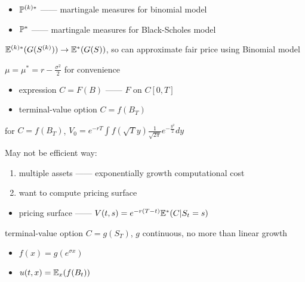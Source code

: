 \begin{itemize}
    \item $\mathbb{P}^{(k)*}$ ------ martingale measures for binomial model
    \item $\mathbb{P}^{*}$ ------ martingale measures for Black-Scholes model
\end{itemize}

\begin{fact}
    $\mathbb{E}^{(k)*}(G(S^{(k)})) \rightarrow \mathbb{E}^*(G(S))$, so can approximate fair price using Binomial model
\end{fact}

\begin{setting}
    $\mu = \mu^* = r - \frac{\sigma^2}{2}$ for convenience
\end{setting}

\begin{itemize}
    \item expression $C = F(B)$ ------ $F$ on $C[0, T]$
    \item terminal-value option $C = f(B_T)$
\end{itemize}

\begin{fact}
    for $C = f(B_T)$, $V_0 = e^{-rT}\int f\left(\sqrt{T}y\right)\frac{1}{\sqrt{2\pi}}e^{-\frac{y^2}{2}}dy$
\end{fact}

\begin{fact}
    May not be efficient way:
    \begin{enumerate}
        \item multiple assets ------ exponentially growth computational cost
        \item want to compute pricing surface
    \end{enumerate}
\end{fact}

\begin{itemize}
    \item pricing surface ------ $V(t, s) = e^{-r(T - t)}\mathbb{E}^*(C|S_t = s)$
\end{itemize}

\begin{setting}
    terminal-value option $C = g(S_T)$, $g$ continuous, no more than linear growth
\end{setting}

\begin{itemize}
    \item $f(x) = g(e^{\sigma x})$
    \item $u(t, x) = \mathbb{E}_x(f(B_t))$
\end{itemize}

